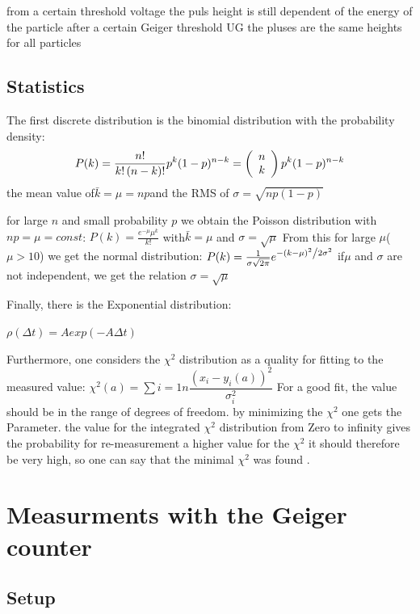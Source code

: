 from a certain threshold voltage the puls height is still dependent of the energy of the particle  after a certain Geiger threshold UG the pluses 
are the same heights for all particles

\subsection{Statistics}

The first discrete distribution is the binomial distribution with the probability density:$$ P(k) = \frac{{n!}}{{k!\left( {n - k} \right)!}}p^k (1-p)^{n - k} = \left( {\begin{array}{*{20}c} n \\ k \\ \end{array}} \right)p^k (1-p)^{n - k}$$
the mean value of$\bar{k}=\mu=np$and the RMS of $\sigma=\sqrt{np(1-p)}$


for large $n$ and small probability $p$ we obtain the Poisson distribution with $np= \mu=const$:
$P\left( k \right) = \frac{{e^{ - \mu } \mu ^k }}{{k!}}$ with$\bar{k}=\mu$ and $\sigma=\sqrt{\mu}$
From this for large $\mu$($\mu>10$) we get the normal distribution:
$P(k) = \frac{1}{{\sigma \sqrt {2\pi } }}e^{{{ - \left( {k - \mu } \right)^2 } \mathord{\left/ {\vphantom {{ - \left( {k - \mu } \right)^2 } {2\sigma ^2 }}} \right. \kern-\nulldelimiterspace} {2\sigma ^2 }}}$
if$\mu$ and $\sigma$ are not independent, we get the relation $\sigma =\sqrt{\mu}$

Finally, there is the Exponential distribution:

$\rho(\Delta t)= Aexp(-A\Delta t)$

Furthermore, one considers the $\chi^2$ distribution as a quality for fitting to the measured value:
$\chi^2(a)=\sum{i=1}{n}{\dfrac{(x_i-y_i(a))^2}{\sigma_i^2}}$
For a good fit, the value should be in the range of degrees of freedom.
by minimizing the $\chi^2$ one gets the Parameter.
the value for the integrated $\chi^2$ distribution from Zero to infinity gives the probability for re-measurement 
a higher value for the $\chi^2$ it should therefore be very high, so one can say that the minimal $\chi^2$ was found .

\section{Measurments with the Geiger counter}

\subsection{Setup}

